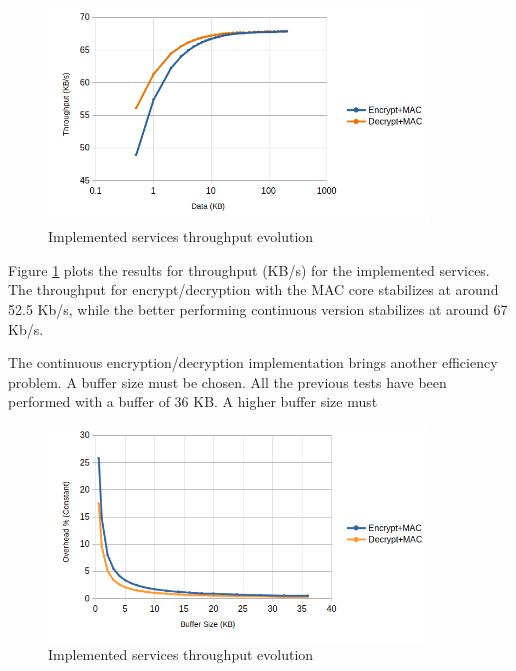 \begin{figure}[h!]
	\centering
	\includegraphics[width=0.9\textwidth]{./Images/services-tput.png}
	\caption{Implemented services throughput evolution}
	\label{fig:performance:services-tput}
\end{figure}

Figure \ref{fig:performance:services-tput} plots the results for throughput (KB/s) for the implemented services.
The throughput for encrypt/decryption with the MAC core stabilizes at around 52.5 Kb/s, while the better performing continuous version stabilizes at around 67 Kb/s.

The continuous encryption/decryption implementation brings another efficiency problem. A buffer size must be chosen. All the previous tests have been performed with a buffer of 36 KB. A higher buffer size must

\begin{figure}[h!]
	\centering
	\includegraphics[width=0.9\textwidth]{./Images/buffer-overhead.png}
	\caption{Implemented services throughput evolution}
	\label{fig:performance:buffer-overhead}
\end{figure}



